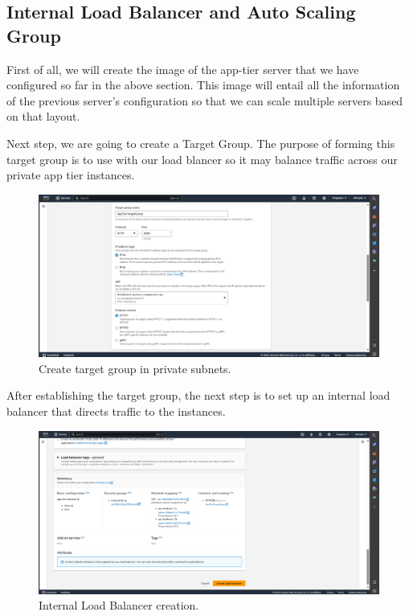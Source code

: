 \documentclass{article}
\begin{document}
\subsection{Internal Load Balancer and Auto Scaling Group}
First of all, we will create the image of the app-tier server that we have configured so far in the above section. This image will entail all the information of the previous server's configuration so that we can scale multiple servers based on that layout.\par

Next step, we are going to create a Target Group. The purpose of forming this target group is to use with our load blancer so it may balance traffic across our private app tier instances.\par

\begin{figure}[h]
    \centering
    \includegraphics[width=12cm]{Pictures/Internal LB/TG_create.png}
    \caption{Create target group in private subnets.}
    \label{fig:enter-label}
\end{figure}

After establishing the target group, the next step is to set up an internal load balancer that directs traffic to the instances.\par

\begin{figure}[h]
    \centering
    \includegraphics[width=12cm]{Pictures/Internal LB/internal_lb_4.png}
    \caption{Internal Load Balancer creation.}
    \label{fig:enter-label}
\end{figure}
\end{document}
